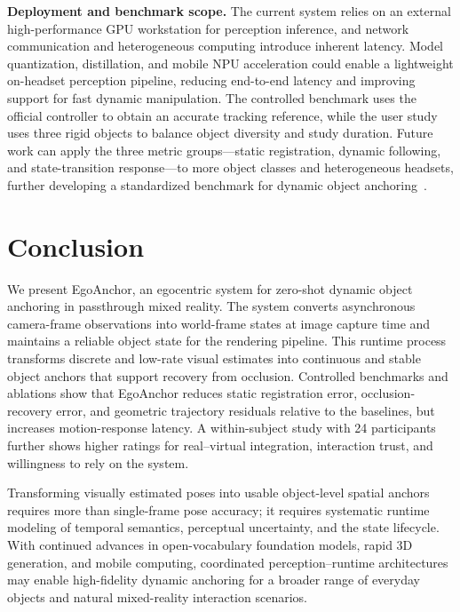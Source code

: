\documentclass[review]{vgtc}
\begin{document}
\textbf{Deployment and benchmark scope.}
The current system relies on an external high-performance GPU workstation for perception inference, and network communication and heterogeneous computing introduce inherent latency. Model quantization, distillation, and mobile NPU acceleration could enable a lightweight on-headset perception pipeline, reducing end-to-end latency and improving support for fast dynamic manipulation. The controlled benchmark uses the official controller to obtain an accurate tracking reference, while the user study uses three rigid objects to balance object diversity and study duration. Future work can apply the three metric groups---static registration, dynamic following, and state-transition response---to more object classes and heterogeneous headsets, further developing a standardized benchmark for dynamic object anchoring~\cite{cheng2024tracking,hu2024applemeta,hu2025xrrealitycheck}.

\section{Conclusion}\label{sec:conclusion}

We present EgoAnchor, an egocentric system for zero-shot dynamic object anchoring in passthrough mixed reality. The system converts asynchronous camera-frame observations into world-frame states at image capture time and maintains a reliable object state for the rendering pipeline. This runtime process transforms discrete and low-rate visual estimates into continuous and stable object anchors that support recovery from occlusion. Controlled benchmarks and ablations show that EgoAnchor reduces static registration error, occlusion-recovery error, and geometric trajectory residuals relative to the baselines, but increases motion-response latency. A within-subject study with 24 participants further shows higher ratings for real--virtual integration, interaction trust, and willingness to rely on the system.

Transforming visually estimated poses into usable object-level spatial anchors requires more than single-frame pose accuracy; it requires systematic runtime modeling of temporal semantics, perceptual uncertainty, and the state lifecycle. With continued advances in open-vocabulary foundation models, rapid 3D generation, and mobile computing, coordinated perception--runtime architectures may enable high-fidelity dynamic anchoring for a broader range of everyday objects and natural mixed-reality interaction scenarios.




\end{document}
